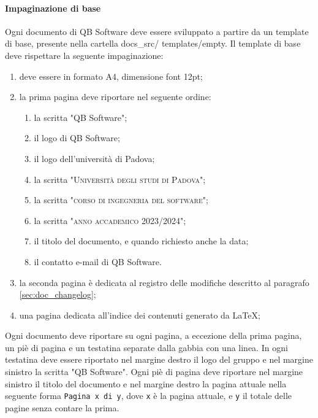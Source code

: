         \paragraph{Impaginazione di base}
            Ogni documento di QB Software deve essere sviluppato a partire da un template di base, presente nella cartella docs\_src/ templates/empty. Il template di base deve rispettare la seguente impaginazione:
            \begin{enumerate}[label=\Roman*)]
                \item deve essere in formato A4, dimensione font 12pt;
                \item la prima pagina deve riportare nel seguente ordine:
                \begin{enumerate}[label=\arabic*.]
                    \item la scritta "QB Software";
                    \item il logo di QB Software;
                    \item il logo dell'università di Padova;
                    \item la scritta "\textsc{Università degli studi di Padova}";
                    \item la scritta "\textsc{corso di ingegneria del software}";
                    \item la scritta "\textsc{anno accademico 2023/2024}";
                    \item il titolo del documento, e quando richiesto anche la data;
                    \item il contatto e-mail di QB Software.
                \end{enumerate}
                \item la seconda pagina è dedicata al registro delle modifiche descritto al paragrafo \ref{sec:doc_changelog};
                \item una pagina dedicata all'indice dei contenuti generato da \LaTeX;
            \end{enumerate}
            Ogni documento deve riportare su ogni pagina, a eccezione della prima pagina, un piè di pagina e un testatina separate dalla gabbia con una linea. In ogni testatina deve essere riportato nel margine destro il logo del gruppo e nel margine sinistro la scritta "QB Software". Ogni piè di pagina deve riportare nel margine sinistro il titolo del documento e nel margine destro la pagina attuale nella seguente forma \verb|Pagina x di y|, dove \verb|x| è la pagina attuale, e \verb|y| il totale delle pagine senza contare la prima.
        
